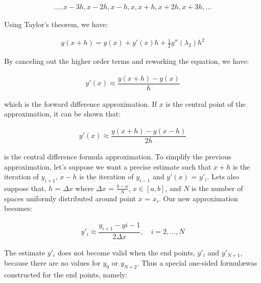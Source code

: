 \documentclass[12pt]{article}
\begin{document}
\begin{eqnarray*}
...,x-3h,x-2h,x-h,x,x+h,x+2h,x+3h,...
\end {eqnarray*}

\begin{doublespace}
\noindent
Using Taylor's theorem, we have:
\end{doublespace}

\begin{eqnarray*}
y(x+h)=y(x)+y'(x)h+{\frac{1}{2}}y''(\lambda_{2})h^{2}
\end{eqnarray*}

\begin{doublespace}
\noindent
By canceling out the higher order terms and reworking the equation, we have:
\end{doublespace}

\begin{eqnarray*}
y'(x) \approx \dfrac{y(x+h)-y(x)}{h}
\end{eqnarray*}

\begin{doublespace}
\noindent
which is the forward difference approximation. If $x$ is the central point of the approximation, it can be shown that:
\end{doublespace}

\begin{eqnarray*}
y'(x) \approx \dfrac{y(x+h)-y(x-h)}{2h}
\end{eqnarray*}

\begin{doublespace}
\noindent
is the central difference formula approximation. To simplify the previous approximation, let's suppose we want a precise estimate such that $x+h$ is the iteration of $y_{i+1}$, $x-h$ is the iteration of $y_{i-1}$ and $y'(x)$ = $y'_{i}$. Lets also suppose that, $h$ = $\Delta{x}$ where $\Delta{x}$ = $\frac{b-a}{N}$, $x\in[a,b]$, and $N$ is the number of spaces uniformly distributed around point $x$ = $x_{i}$. Our new approximation becomes:
\end{doublespace}

\begin{eqnarray*}
y'_{i} \approx \dfrac{y_{i+1}-y{i-1}}{2\Delta{x}}, \quad i = 2,...,N
\end{eqnarray*}

\begin{doublespace}
\noindent
The estimate $y'_{i}$ does not become valid when the end points, $y'_{i}$ and $y'_{N+1}$, because there are no values for $y_{0}$ or $y_{N+2}$. Thus a special one-sided formul\ae was constructed for the end points, namely:
\end{doublespace}
\end{document}

